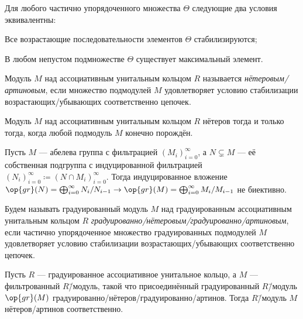 \documentclass[
	extrafontsizes,
	11pt,
	hyphens,
]{memoir}
\begin{document}
\begin{observation}
Для любого частично упорядоченного множества \(\Theta\) следующие два условия эквивалентны:
\begin{enumerate*}[
	font=\upshape,
	label=\asbuk*),
	ref=\asbuk*,
	]
\item
Все возрастающие последовательности элементов \(\Theta\) стабилизируются;
\item
В любом непустом подмножестве \(\Theta\) существует максимальный элемент.
\end{enumerate*}
\end{observation}

\begin{definition}
Модуль \(M\) над ассоциативным унитальным кольцом \(R\) называется \emph{нётеровым/артиновым}, если множество подмодулей \(M\) удовлетворяет условию стабилизации возрастающих/убывающих соответственно цепочек.
\end{definition}

\begin{observation}
Модуль \(M\) над ассоциативным унитальным кольцом \(R\) нётеров тогда и только тогда, когда любой подмодуль \(M\) конечно порождён.
\end{observation}

\begin{observation}
Пусть \(M\) --- абелева группа с фильтрацией \((M_i)_{i=0}^{\infty}\), а \(N \varsubsetneq M\) --- её собственная подгруппа с индуцированной фильтрацией
\((N_i)_{i = 0}^{\infty} \coloneqq (N \cap M_i)_{i = 0}^{\infty}\).%
\label{obs:FiltSubgrEmb}
Тогда индуцированное вложение
\(\op{gr}(N) = \bigoplus_{i = 0}^{\infty} N_i / N_{i-1} \to \op{gr}(M) = \bigoplus_{i = 0}^{\infty} M_i / M_{i-1}\)
не биективно.
\end{observation}

\begin{definition}
Будем называть градуированный модуль \(M\) над градуированным ассоциативным унитальным кольцом \(R\) \emph{градуированно\-/нётеровым\slash градуированно\-/артиновым}, если частично упорядоченное множество градуированных подмодулей \(M\) удовлетворяет условию стабилизации возрастающих\slash убывающих соответственно цепочек.
\end{definition}

\begin{theorem}
Пусть \(R\) --- градуированное ассоциативное унитальное кольцо, а \(M\) --- фильтрованный \(R\)\=/модуль, такой что присоединённый градуированный \(R\)\=/модуль \(\op{gr}(M)\) градуированно\-/нётеров\slash градуированно\-/артинов.%
\label{thm:HilbBasisGen}
Тогда \(R\)\=/модуль \(M\) нётеров\slash артинов соответственно.
\end{theorem}
\end{document}

